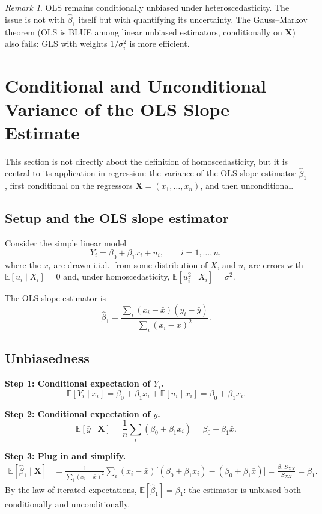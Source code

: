 \documentclass[a4paper,oneside,12pt]{extarticle}
\theoremstyle{plain}
\theoremstyle{definition}
\theoremstyle{remark}
\newtheorem{remark}[proposition]{Remark}
\newcommand*{\E}{\mathbb{E}}
\begin{document}
\begin{remark}
OLS remains conditionally unbiased under heteroscedasticity. The issue
is not with $\hat\beta_1$ itself but with quantifying its uncertainty.
The Gauss--Markov theorem (OLS is BLUE among linear unbiased estimators,
conditionally on $\mathbf{X}$) also fails: GLS with weights $1/\sigma_i^2$
is more efficient.
\end{remark}


\section{Conditional and Unconditional Variance of the OLS Slope Estimate}
\label{sec:cond_uncond_var}

This section is not directly about the definition of homoscedasticity,
but it is central to its application in regression: the variance of the
OLS slope estimator $\hat\beta_1$, first conditional on the regressors
$\mathbf{X} = (x_1,\ldots,x_n)$, and then unconditional.

\subsection{Setup and the OLS slope estimator}

Consider the simple linear model
\[
  Y_i = \beta_0 + \beta_1 x_i + u_i, \qquad i = 1,\ldots,n,
\]
where the $x_i$ are drawn i.i.d.\ from some distribution of $X$,
and $u_i$ are errors with $\E[u_i \mid X_i] = 0$ and, under
homoscedasticity, $\E[u_i^2 \mid X_i] = \sigma^2$.

The OLS slope estimator is
\[
  \hat\beta_1 = \frac{\sum_i (x_i - \bar x)(y_i - \bar y)}{\sum_i (x_i - \bar x)^2}.
\]

\subsection{Unbiasedness}

\textbf{Step 1: Conditional expectation of $Y_i$.}
\[
  \E[Y_i \mid x_i] = \beta_0 + \beta_1 x_i + \E[u_i \mid x_i] = \beta_0 + \beta_1 x_i.
\]

\textbf{Step 2: Conditional expectation of $\bar y$.}
\[
  \E[\bar y \mid \mathbf{X}]
  = \frac{1}{n}\sum_i (\beta_0 + \beta_1 x_i)
  = \beta_0 + \beta_1 \bar x.
\]

\textbf{Step 3: Plug in and simplify.}
\begin{align*}
  \E[\hat\beta_1 \mid \mathbf{X}]
  &= \frac{1}{\sum_i (x_i-\bar x)^2}\sum_i (x_i-\bar x)
     \bigl[(\beta_0+\beta_1 x_i) - (\beta_0+\beta_1\bar x)\bigr]
   = \frac{\beta_1\,S_{XX}}{S_{XX}} = \beta_1.
\end{align*}
By the law of iterated expectations, $\E[\hat\beta_1] = \beta_1$: the
estimator is unbiased both conditionally and unconditionally.
\end{document}
